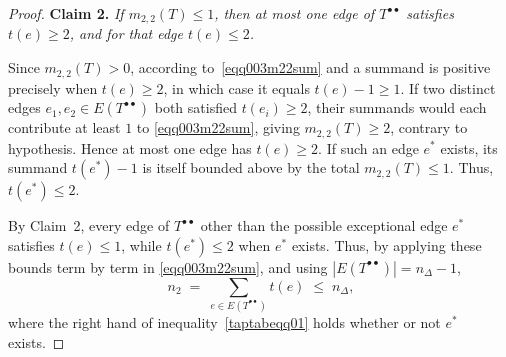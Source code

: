 \documentclass[12pt]{amsart}
\begin{document}
\begin{proof}
\smallskip
\noindent\textbf{Claim 2.} \emph{If $m_{2,2}(T)\leqslant 1$, then at most one edge of $T^{\bullet\bullet}$ satisfies $t(e)\geqslant 2$, and for that edge $t(e)\leqslant 2$.}

Since $m_{2,2}(T)>0$, according to~\eqref{eqq003m22sum} and a summand
is positive precisely when $t(e)\geqslant 2$, in which case it equals $t(e)-1\geqslant 1$. If two distinct edges $e_1,e_2\in E(T^{\bullet\bullet})$ both satisfied
$t(e_i)\geqslant 2$, their summands would each contribute at least $1$ to
\eqref{eqq003m22sum}, giving $m_{2,2}(T)\geqslant 2$, contrary to hypothesis. Hence at most one edge has $t(e)\geqslant 2$. If such an edge $e^\ast$ exists, its summand
$t(e^\ast)-1$ is itself bounded above by the total $m_{2,2}(T)\le1$. Thus, $t(e^\ast)\leqslant 2$.

\smallskip
  By Claim~2, every edge of
$T^{\bullet\bullet}$ other than the possible exceptional edge $e^\ast$ satisfies $t(e)\leqslant 1$, while $t(e^\ast)\leqslant 2$ when $e^\ast$ exists. Thus, by applying
these bounds term by term in \eqref{eqq003m22sum}, and using
$|E(T^{\bullet\bullet})|=n_\Delta-1$,
\begin{equation}~\label{taptabeqq01}
n_2 \;=\; \sum_{e\in E(T^{\bullet\bullet})} t(e)
\;\leqslant\; n_\Delta,
\end{equation}
where the right hand of inequality~\eqref{taptabeqq01} holds whether or not $e^\ast$ exists. 
\end{proof}
\end{document}
